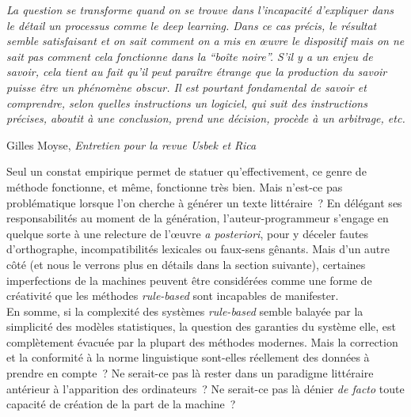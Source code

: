 \documentclass{article}
\newenvironment{citationbox}
{\begin{center}
		\begin{minipage}{.8\textwidth}
		}
		{
		\end{minipage}	
\end{center}
}
\begin{document}
			\begin{citationbox}
				\textit{La question se transforme quand on se trouve dans l’incapacité d’expliquer dans le détail un processus comme le deep learning. Dans ce cas précis, le résultat semble satisfaisant et on sait comment on a mis en œuvre le dispositif mais on ne sait pas comment cela fonctionne dans la ``boîte noire''. S’il y a un enjeu de savoir, cela tient au fait qu’il peut paraître étrange que la production du savoir puisse être un phénomène obscur. Il est pourtant fondamental de savoir et comprendre, selon quelles instructions un logiciel, qui suit des instructions précises, aboutit à une conclusion, prend une décision, procède à un arbitrage, etc.}
				\begin{flushright}
					Gilles Moyse, \textit{Entretien pour la revue Usbek et Rica} \cite{edin2018}
				\end{flushright}
			\end{citationbox}
			Seul un constat empirique permet de statuer qu'effectivement, ce genre de méthode fonctionne, et même, fonctionne très bien. Mais n'est-ce pas problématique lorsque l'on cherche à générer un texte littéraire~? En délégant ses responsabilités au moment de la génération, l'auteur-programmeur s'engage en quelque sorte à une relecture de l'œuvre \textit{a posteriori}, pour y déceler fautes d'orthographe, incompatibilités lexicales ou faux-sens gênants. Mais d'un autre côté (et nous le verrons plus en détails dans la section suivante), certaines imperfections de la machines peuvent être considérées comme une forme de créativité que les méthodes \textit{rule-based} sont incapables de manifester.\\
			
			En somme, si la complexité des systèmes \textit{rule-based} semble balayée par la simplicité des modèles statistiques, la question des garanties du système elle, est complètement évacuée par la plupart des méthodes modernes. Mais la correction et la conformité à la norme linguistique sont-elles réellement des données à prendre en compte~? Ne serait-ce pas là rester dans un paradigme littéraire antérieur à l'apparition des ordinateurs~? Ne serait-ce pas là dénier \textit{de facto} toute capacité de création de la part de la machine~?
		\newpage
\end{document}
